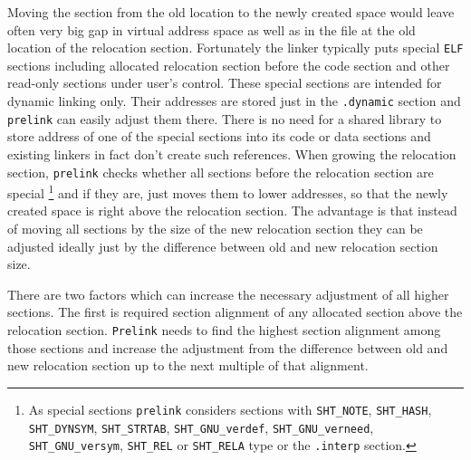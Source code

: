 \documentclass[twoside]{article}
\def\tts#1{\texttt{\small #1}}
\begin{document}
Moving the section from the old location to the newly created space
would leave often very big gap in virtual address space as well as in
the file at the old location of the relocation section.  Fortunately the
linker typically puts special \tts{ELF} sections including allocated
relocation section before the code section and other read-only sections
under user's control.  These special sections are intended for dynamic
linking only.  Their addresses are stored just in the \tts{.dynamic} section
and \tts{prelink} can easily adjust them there.  There is no need for
a shared library to store address of one of the special sections
into its code or data sections and existing linkers in fact don't create
such references.  When growing the relocation section, \tts{prelink}
checks whether all sections before the relocation section are
special
\footnote{As special sections \tts{prelink} considers sections with
\tts{SHT\_NOTE}, \tts{SHT\_HASH}, \tts{SHT\_DYNSYM}, \tts{SHT\_STRTAB},
\tts{SHT\_GNU\_verdef}, \tts{SHT\_GNU\_verneed}, \tts{SHT\_GNU\_versym},
\tts{SHT\_REL} or \tts{SHT\_RELA} type or the \tts{.interp} section.}
and if they are, just moves them to lower addresses, so that the
newly created space is right above the relocation section.
The advantage is that instead of moving all sections by the size of
the new relocation section they can be adjusted ideally just by the
difference between old and new relocation section size.

There are two factors which can increase the necessary adjustment of
all higher sections.  The first is required section alignment of any
allocated section above the relocation section.  \tts{Prelink} needs
to find the highest section alignment among those sections and
increase the adjustment from the difference between old and new
relocation section up to the next multiple of that alignment.
\end{document}

